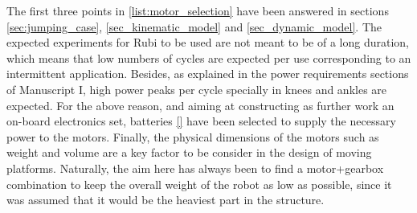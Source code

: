 The first three points in \ref{list:motor_selection} have been answered in sections \ref{sec:jumping_case}, \ref{sec_kinematic_model} and \ref{sec_dynamic_model}.
The expected experiments for Rubi to be used are not meant to be of a long duration, which means that low numbers of cycles are expected per use corresponding to an intermittent application.
Besides, as explained in the power requirements sections of \cite{grimmer} Manuscript I, high power peaks per cycle specially in knees and ankles are expected.
For the above reason, and aiming at constructing as further work an on-board electronics set, batteries \ref{} %
have been selected to supply the necessary power to the motors.
Finally, the physical dimensions of the motors such as weight and volume are a key factor to be consider in the design of moving platforms. 
Naturally, the aim here has always been to find a motor+gearbox combination to keep the overall weight of the robot as low as possible, since it was assumed that it would be the heaviest part in the structure.
